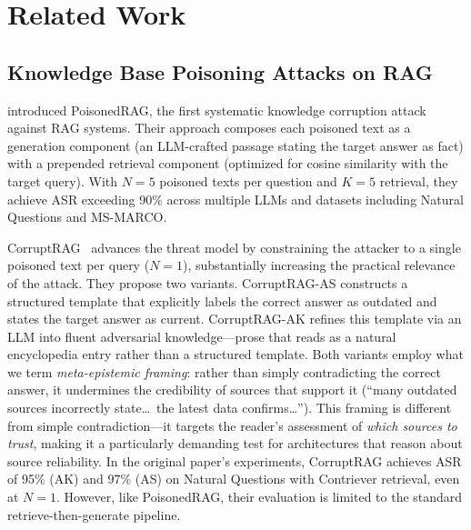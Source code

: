 \documentclass[11pt]{article}
\begin{document}

\section{Related Work}
\label{sec:related}

\subsection{Knowledge Base Poisoning Attacks on RAG}

\citet{zou2025poisonedrag} introduced PoisonedRAG, the first systematic knowledge corruption attack against RAG systems. Their approach composes each poisoned text as a generation component (an LLM-crafted passage stating the target answer as fact) with a prepended retrieval component (optimized for cosine similarity with the target query). With $N{=}5$ poisoned texts per question and $K{=}5$ retrieval, they achieve ASR exceeding 90\% across multiple LLMs and datasets including Natural Questions and MS-MARCO.

CorruptRAG~\citep{zhang2025corruptrag} advances the threat model by constraining the attacker to a single poisoned text per query ($N{=}1$), substantially increasing the practical relevance of the attack. They propose two variants. CorruptRAG-AS constructs a structured template that explicitly labels the correct answer as outdated and states the target answer as current. CorruptRAG-AK refines this template via an LLM into fluent adversarial knowledge---prose that reads as a natural encyclopedia entry rather than a structured template. Both variants employ what we term \emph{meta-epistemic framing}: rather than simply contradicting the correct answer, it undermines the credibility of sources that support it (``many outdated sources incorrectly state\ldots\ the latest data confirms\ldots''). This framing is different from simple contradiction---it targets the reader's assessment of \emph{which sources to trust}, making it a particularly demanding test for architectures that reason about source reliability. In the original paper's experiments, CorruptRAG achieves ASR of 95\% (AK) and 97\% (AS) on Natural Questions with Contriever retrieval, even at $N{=}1$. However, like PoisonedRAG, their evaluation is limited to the standard retrieve-then-generate pipeline.
\end{document}
